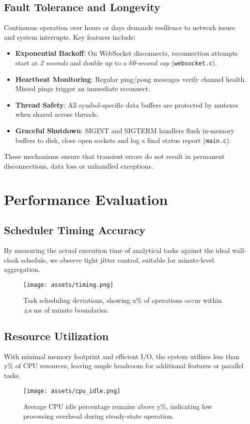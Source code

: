 \documentclass{article}
\begin{document}
\subsection{Fault Tolerance and Longevity}
Continuous operation over hours or days demands resilience to network issues and system interrupts. Key features include:
\begin{itemize}
  \item \textbf{Exponential Backoff}: On WebSocket disconnects, reconnection attempts start at \textit{2 seconds} and double up to a \textit{60-second cap} (\texttt{websocket.c}).
  \item \textbf{Heartbeat Monitoring}: Regular ping/pong messages verify channel health. Missed pings trigger an immediate reconnect.
  \item \textbf{Thread Safety}: All symbol-specific data buffers are protected by mutexes when shared across threads.
  \item \textbf{Graceful Shutdown}: SIGINT and SIGTERM handlers flush in-memory buffers to disk, close open sockets and log a final status report (\texttt{main.c}).
\end{itemize}
These mechanisms ensure that transient errors do not result in permanent disconnections, data loss or unhandled exceptions. \newpage

\section{Performance Evaluation}

\subsection{Scheduler Timing Accuracy}
By measuring the actual execution time of analytical tasks against the ideal wall-clock schedule, we observe tight jitter control, suitable for minute-level aggregation.
\begin{figure}[h]
  \centering
  \texttt{[image: assets/timing.png]}
  \caption{Task scheduling deviations, showing x\% of operations occur within $\pm\kappa$\,ms of minute boundaries.}
\end{figure}

\subsection{Resource Utilization}
With minimal memory footprint and efficient I/O, the system utilizes less than y\% of CPU resources, leaving ample headroom for additional features or parallel tasks.
\begin{figure}[h]
  \centering
  \texttt{[image: assets/cpu\_idle.png]}
  \caption{Average CPU idle percentage remains above y\%, indicating low processing overhead during steady-state operation.}
\end{figure}
\end{document}
